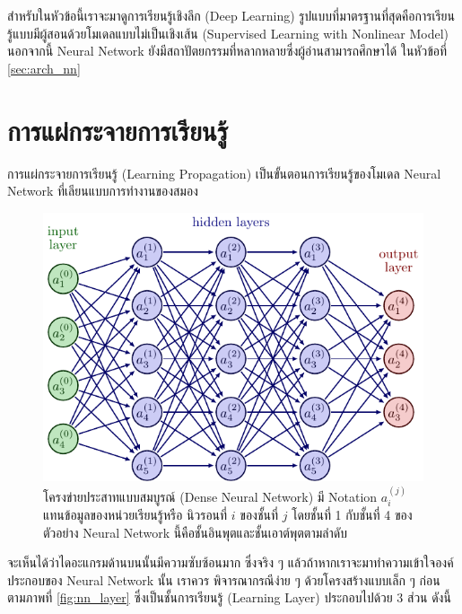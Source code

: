 สำหรับในหัวข้อนี้เราจะมาดูการเรียนรู้เชิงลึก (Deep Learning) รูปแบบที่มาตรฐานที่สุดคือการเรียนรู้แบบมีผู้สอนด้วยโมเดลแบบไม่เป็นเชิงเส้น
(Supervised Learning with Nonlinear Model) นอกจากนี้ Neural Network ยังมีสถาปัตยกรรมที่หลากหลายซึ่งผู้อ่านสามารถศึกษาได้%
ในหัวข้อที่ \ref{sec:arch_nn}

\section{การแผ่กระจายการเรียนรู้}

การแผ่กระจายการเรียนรู้ (Learning Propagation) เป็นขั้นตอนการเรียนรู้ของโมเดล Neural Network ที่เลียนแบบการทำงานของสมอง

\begin{figure}[H]
    \includegraphics[width=\linewidth]{fig/dense_neural_net.pdf}
    \caption{โครงข่ายประสาทแบบสมบูรณ์ (Dense Neural Network) มี Notation $a^{(j)}_{i}$ แทนข้อมูลของหน่วยเรียนรู้หรือ%
        นิวรอนที่ $i$ ของชั้นที่ $j$ โดยชั้นที่ 1 กับชั้นที่ 4 ของตัวอย่าง Neural Network นี้คือชั้นอินพุตและชั้นเอาต์พุตตามลำดับ}
    \label{fig:dense_neural_net}
\end{figure}

จะเห็นได้ว่าไดอะแกรมด้านบนนั้นมีความซับซ้อนมาก ซึ่งจริง ๆ แล้วถ้าหากเราจะมาทำความเข้าใจองค์ประกอบของ Neural Network นั้น เราควร%
พิจารณากรณีง่าย ๆ ด้วยโครงสร้างแบบเล็ก ๆ ก่อน ตามภาพที่ \ref{fig:nn_layer} ซึ่งเป็นชั้นการเรียนรู้ (Learning Layer) ประกอบไปด้วย
3 ส่วน ดังนี้


